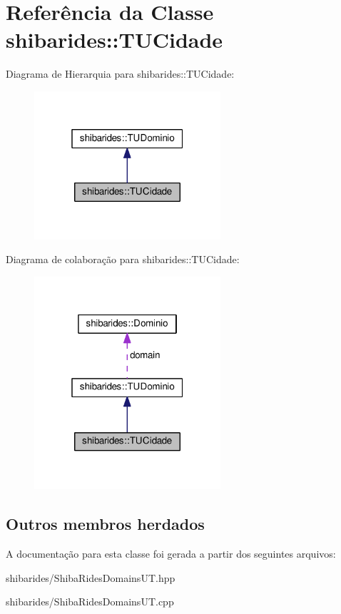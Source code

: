 \hypertarget{classshibarides_1_1TUCidade}{}\section{Referência da Classe shibarides\+:\+:T\+U\+Cidade}
\label{classshibarides_1_1TUCidade}


Diagrama de Hierarquia para shibarides\+:\+:T\+U\+Cidade\+:\nopagebreak
\begin{figure}[H]
\begin{center}
\leavevmode
\includegraphics[width=196pt]{classshibarides_1_1TUCidade__inherit__graph}
\end{center}
\end{figure}


Diagrama de colaboração para shibarides\+:\+:T\+U\+Cidade\+:\nopagebreak
\begin{figure}[H]
\begin{center}
\leavevmode
\includegraphics[width=196pt]{classshibarides_1_1TUCidade__coll__graph}
\end{center}
\end{figure}
\subsection*{Outros membros herdados}


A documentação para esta classe foi gerada a partir dos seguintes arquivos\+:\begin{DoxyCompactItemize}
\item 
shibarides/Shiba\+Rides\+Domains\+U\+T.\+hpp\item 
shibarides/Shiba\+Rides\+Domains\+U\+T.\+cpp\end{DoxyCompactItemize}
